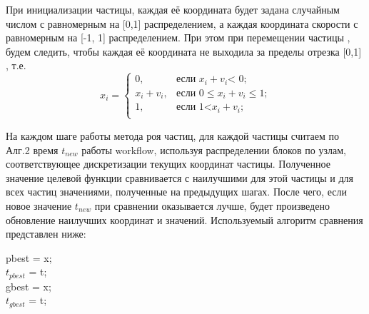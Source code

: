 \documentclass[a4paper,12pt]{article}
\begin{document}
При инициализации частицы, каждая её координата будет задана случайным числом с равномерным на [0,1] распределением, а каждая координата скорости с равномерным на [-1, 1] распределением. При этом при перемещении частицы , будем следить, чтобы каждая её координата не выходила за пределы отрезка [0,1] , т.е. 
$$x_{i}=
\begin{cases}
0,&\text{если $x_{i} + v_{i}$< 0;}\\
x_{i} + v_{i},&\text{если 0$\leq x_{i} + v_{i}\leq$1;}\\
1,&\text{если 1<$x_{i} + v_{i}$;}\\
\end{cases}
$$



На каждом шаге работы метода роя частиц, для каждой частицы считаем по Алг.2 время $t_{new}$ работы workflow, используя распределении блоков по узлам, соответствующее дискретизации текущих координат частицы. Полученное значение целевой функции сравнивается с наилучшими для этой частицы и для всех частиц значениями, полученные на предыдущих шагах. После чего, если новое значение $t_{new}$ при сравнении оказывается лучше, будет произведено обновление наилучших координат и значений. Используемый алгоритм сравнения представлен ниже:
\begin{algorithm}
 {
	pbest = x;\\	$t_{pbest}$ = t;\\
	 {
	gbest = x;\\
	$t_{gbest}$ = t;\\
	}
}

\label{alg:time_calc}
\end{algorithm}
\newpage
\end{document}
